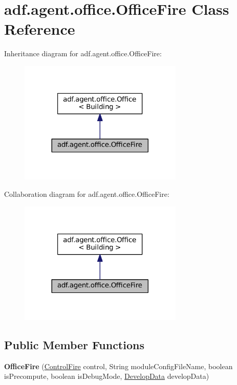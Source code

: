 \hypertarget{classadf_1_1agent_1_1office_1_1OfficeFire}{}\section{adf.\+agent.\+office.\+Office\+Fire Class Reference}
\label{classadf_1_1agent_1_1office_1_1OfficeFire}


Inheritance diagram for adf.\+agent.\+office.\+Office\+Fire\+:
\nopagebreak
\begin{figure}[H]
\begin{center}
\leavevmode
\includegraphics[width=221pt]{classadf_1_1agent_1_1office_1_1OfficeFire__inherit__graph}
\end{center}
\end{figure}


Collaboration diagram for adf.\+agent.\+office.\+Office\+Fire\+:
\nopagebreak
\begin{figure}[H]
\begin{center}
\leavevmode
\includegraphics[width=221pt]{classadf_1_1agent_1_1office_1_1OfficeFire__coll__graph}
\end{center}
\end{figure}
\subsection*{Public Member Functions}
\begin{DoxyCompactItemize}
\item 
\hypertarget{classadf_1_1agent_1_1office_1_1OfficeFire_a7123f1a425954a8027bb91bf59b97dae}{}\label{classadf_1_1agent_1_1office_1_1OfficeFire_a7123f1a425954a8027bb91bf59b97dae} 
{\bfseries Office\+Fire} (\hyperlink{classadf_1_1component_1_1control_1_1ControlFire}{Control\+Fire} control, String module\+Config\+File\+Name, boolean is\+Precompute, boolean is\+Debug\+Mode, \hyperlink{classadf_1_1agent_1_1develop_1_1DevelopData}{Develop\+Data} develop\+Data)
\end{DoxyCompactItemize}
